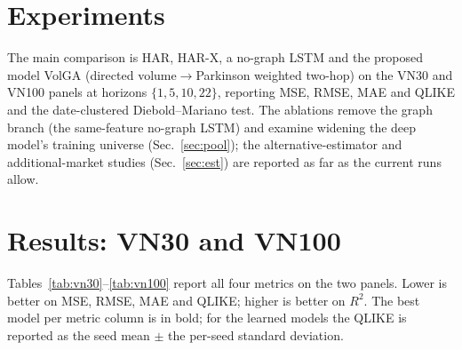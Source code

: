 \documentclass[runningheads]{llncs}
\begin{document}
\section{Experiments}
The main comparison is HAR, HAR-X, a no-graph LSTM and the proposed model VolGA (directed
volume$\to$Parkinson weighted two-hop) on the VN30 and VN100 panels at horizons $\{1,5,10,22\}$,
reporting MSE, RMSE, MAE and QLIKE and the date-clustered Diebold--Mariano test. The ablations remove
the graph branch (the same-feature no-graph LSTM) and examine widening the deep model's training
universe (Sec.~\ref{sec:pool}); the alternative-estimator and additional-market studies
(Sec.~\ref{sec:est}) are reported as far as the current runs allow.

\section{Results: VN30 and VN100}\label{sec:results}
Tables~\ref{tab:vn30}--\ref{tab:vn100} report all four metrics on the two panels. Lower is better on
MSE, RMSE, MAE and QLIKE; higher is better on $R^2$. The best model per metric column is in bold; for
the learned models the QLIKE is reported as the seed mean $\pm$ the per-seed standard deviation.
\end{document}
